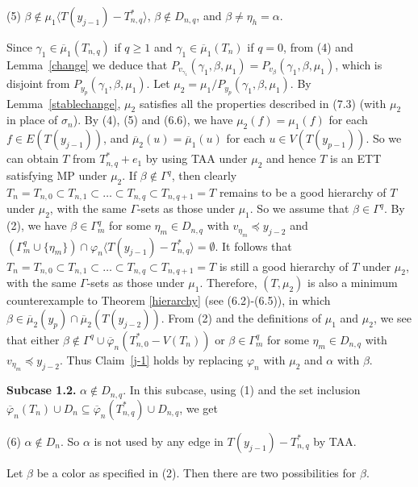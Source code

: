 \documentclass[11pt]{article}
\newcommand{\phibar}{\overline{\varphi}}
\begin{document}
(5) $\beta\notin \mu_1 \langle T(y_{j-1}) - T_{n,q}^* \rangle$,  $\beta\notin D_{n,q}$, and $\beta\neq\eta_h=\alpha$. 

Since $\gamma_1 \in \overline{\mu}_1(T_{n,q})$ if $q \ge 1$ and $\gamma_1 \in \overline{\mu}_1(T_n)$ if $q=0$,
from (4) and Lemma~\ref{change} we deduce that $P_{v_{\gamma_1}} (\gamma_1, \beta, \mu_1) = P_{v_{\beta}}
(\gamma_1, \beta, \mu_1)$, which is disjoint from $P_{y_p}(\gamma_1, \beta, \mu_1)$. Let $\mu_2=\mu_1/P_{y_p}(\gamma_1, 
\beta, \mu_1)$. By Lemma~\ref{stablechange},  $\mu_2$ satisfies all the properties described in (7.3) (with $\mu_2$ 
in place of $\sigma_n$). By (4), (5) and (6.6), we have $\mu_2(f)=\mu_1(f)$ for each $f\in E(T(y_{j-1}))$, and $\overline{\mu}_2(u)=\overline{\mu}_1(u)$ for each $u\in V(T(y_{p-1}))$. So we can obtain $T$ from $T_{n,q}^*+e_1$ by 
using TAA under $\mu_2$ and hence $T$ is an ETT satisfying MP under $\mu_2$. If $\beta \notin \Gamma^q$, then clearly 
$T_n=T_{n,0} \subset T_{n,1} \subset \ldots \subset T_{n,q} \subset T_{n,q+1}=T$ remains to be a good hierarchy 
of $T$ under $\mu_2$, with the same $\Gamma$-sets as those under $\mu_1$. So we assume that $\beta \in \Gamma^q$.
By (2), we have $\beta \in\Gamma^{q}_m$ for some $\eta_m\in D_{n,q}$ with $v_{\eta_m} \preceq y_{j-2}$ and 
$(\Gamma^{q}_m \cup \{\eta_m\}) \cap \varphi_n \langle T(y_{j-1}) - T_{n,q}^* \rangle=\emptyset$. It follows
that $T_n=T_{n,0} \subset T_{n,1} \subset \ldots \subset T_{n,q} \subset T_{n,q+1}=T$ is still a good hierarchy 
of $T$ under $\mu_2$, with the same $\Gamma$-sets as those under $\mu_1$.  Therefore, $(T, \mu_2)$ is also a minimum 
counterexample to Theorem \ref{hierarchy} (see (6.2)-(6.5)), in which $\beta \in \overline{\mu}_2(y_p) \cap 
\overline{\mu}_2(T(y_{j-2}))$. From (2) and the definitions of $\mu_1$ and $\mu_2$, we see that 
either $\beta\notin\Gamma^q\cup \phibar_n(T_{n,0}^*-V(T_n))$ or $\beta \in\Gamma^{q}_m$ for some $\eta_m\in D_{n,q}$ 
with $v_{\eta_m} \preceq y_{j-2}$. Thus Claim~\ref{j-1} holds by replacing $\varphi_n$ with $\mu_2$ and $\alpha$ 
with $\beta$. 

{\bf Subcase 1.2.} $\alpha \notin D_{n,q}$. In this subcase, using (1) and the set inclusion $\overline{\varphi}_n(T_n) \cup D_n \subseteq  \overline{\varphi}_n(T_{n,q}^*) \cup D_{n,q}$, we get

(6) $\alpha\notin D_n$. So $\alpha$ is not used by any edge in $T(y_{j-1}) -  T_{n,q}^*$ by TAA.

Let $\beta$ be a color as specified in (2). Then there are two possibilities for $\beta$.
\end{document}
